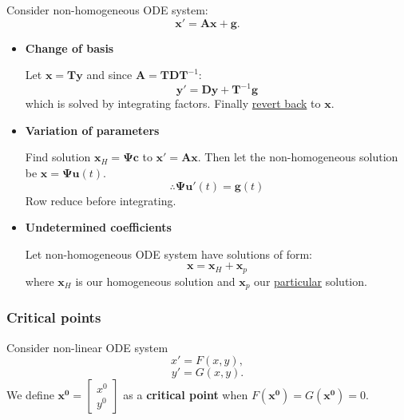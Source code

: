 \documentclass{article}
\begin{document}
\begin{multicols}{3}
Consider non-homogeneous ODE system:
$$\boldsymbol{x}'=\boldsymbol{A}\boldsymbol{x}+\boldsymbol{g}.$$
\begin{itemize}
    \item \textbf{Change of basis}
        
    Let $\boldsymbol{x}=\boldsymbol{T}\boldsymbol{y}$
    and since $\boldsymbol{A}=\boldsymbol{T}\boldsymbol{D}\boldsymbol{T}^{-1}$:
    $$\boldsymbol{y}'=\boldsymbol{D}\boldsymbol{y}+\boldsymbol{T}^{-1}\boldsymbol{g}$$
    which is solved by integrating factors. Finally \underline{revert back} to $\boldsymbol{x}$.

    \item \textbf{Variation of parameters}

    Find solution $\boldsymbol{x}_H=\boldsymbol{\Psi}\boldsymbol{c}$ 
    to $\boldsymbol{x}'=\boldsymbol{A}\boldsymbol{x}$.
    Then let the non-homogeneous solution be
    $\boldsymbol{x}=\boldsymbol{\Psi}\boldsymbol{u}(t)$.
    $$\therefore\boldsymbol{\Psi}\boldsymbol{u}'(t)=\boldsymbol{g}(t)$$
    Row reduce before integrating.

    \item \textbf{Undetermined coefficients}

    Let non-homogeneous ODE system have solutions of form:
    $$\boldsymbol{x}=\boldsymbol{x}_H + \boldsymbol{x}_p$$
    where $\boldsymbol{x}_H$ is our homogeneous solution
    and $\boldsymbol{x}_p$ our \underline{particular} solution.        
    \end{itemize}

\subsubsection*{Critical points}
Consider non-linear ODE system
$$x'=F(x, y),$$
$$y'=G(x, y).$$
We define $\boldsymbol{x^0}=\begin{bmatrix} x^0 \\ y^0 \end{bmatrix}$
as a \textbf{critical point} when $F(\boldsymbol{x^0})=G(\boldsymbol{x^0})=0$.


\end{multicols}
\end{document}
